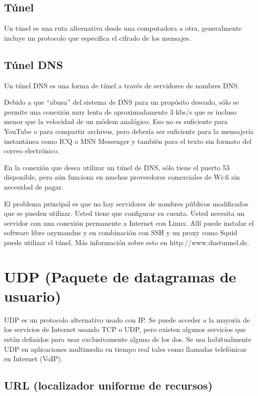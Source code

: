 \subsection{Túnel}\label{tuxfanel}

Un túnel es una ruta alternativa desde una computadora a otra,
generalmente incluye un protocolo que especifica el cifrado de los
mensajes.

\subsection{Túnel DNS}\label{tuxfanel-dns}

Un túnel DNS es una forma de túnel a través de servidores de nombres
DNS.

Debido a que ``abusa'' del sistema de DNS para un propósito deseado,
sólo se permite una conexión muy lenta de aproximadamente 3 kbs/s que es
incluso menor que la velocidad de un módem analógico. Eso no es
suficiente para YouTube o para compartir archivos, pero debería ser
suficiente para la mensajería instantánea como ICQ o MSN Messenger y
también para el texto sin formato del correo electrónico.

En la conexión que desea utilizar un túnel de DNS, sólo tiene el puerto
53 disponible, pero aún funciona en muchos proveedores comerciales de
Wi-fi sin necesidad de pagar.

El problema principal es que no hay servidores de nombres públicos
modificados que se pueden utilizar. Usted tiene que configurar su
cuenta. Usted necesita un servidor con una conexión permanente a
Internet con Linux. Allí puede instalar el software libre ozymandns y en
combinación con SSH y un proxy como Squid puede utilizar el túnel. Más
información sobre esto en http://www.dnstunnel.de.

\section{UDP (Paquete de datagramas de
usuario)}\label{udp-paquete-de-datagramas-de-usuario}

UDP es un protocolo alternativo usado con IP. Se puede acceder a la
mayoría de los servicios de Internet usando TCP o UDP, pero existen
algunos servicios que están definidos para usar exclusivamente alguno de
los dos. Se usa habitualmente UDP en aplicaciones multimedia en tiempo
real tales como llamadas telefónicas en Internet (VoIP).

\subsection{URL (localizador uniforme de
recursos)}\label{url-localizador-uniforme-de-recursos}

